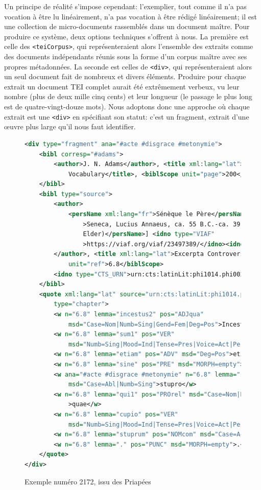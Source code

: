 Un principe de réalité s'impose cependant: l'exemplier, tout comme il n'a pas vocation à être lu linéairement, n'a pas vocation à être rédigé linéairement; il est une collection de micro-documents rassemblés dans un document maître. Pour produire ce système, deux options techniques s'offrent à nous. La première est celle des \texttt{<teiCorpus>}, qui représenteraient alors l'ensemble des extraits comme des documents indépendants réunis sous la forme d'un corpus maître avec ses propres métadonnées. La seconde est celles de \texttt{<div>}, qui représenteraient alors un seul document fait de nombreux et divers éléments. Produire pour chaque extrait un document TEI complet aurait été extrêmement verbeux, vu leur nombre (plus de deux mille cinq cents) et leur longueur (le passage le plus long  est de quatre-vingt-douze mots). Nous adoptons donc une approche où chaque extrait est une \texttt{<div>} en spécifiant son statut: c'est un fragment, extrait d'une œuvre plus large qu'il nous faut identifier.

\begin{figure}
\begin{lstlisting}[language=XML]
<div type="fragment" ana="#acte #disgrace #metonymie">
    <bibl corresp="#adams">
        <author>J. N. Adams</author>, <title xml:lang="lat">The Latin Sexual
            Vocabulary</title>, <biblScope unit="page">200</biblScope>
    </bibl>
    <bibl type="source">
        <author>
            <persName xml:lang="fr">Sénèque le Père</persName> [<persName xml:lang="eng"
                >Seneca, Lucius Annaeus, ca. 55 B.C.-ca. 39 A.D. (Seneca the
                Elder)</persName>] <idno type="VIAF"
                >https://viaf.org/viaf/23497389/</idno><idno type="LC">n82-166595</idno>
        </author>, <title xml:lang="lat">Excerpta Controversiae</title>, <biblScope
            unit="ref">6.8</biblScope>
        <idno type="CTS_URN">urn:cts:latinLit:phi1014.phi002.perseus-lat1</idno>
    </bibl>
    <quote xml:lang="lat" source="urn:cts:latinLit:phi1014.phi002.perseus-lat1:6.8"
        type="chapter">
        <w n="6.8" lemma="incestus2" pos="ADJqua"
            msd="Case=Nom|Numb=Sing|Gend=Fem|Deg=Pos">Incesta</w>
        <w n="6.8" lemma="sum1" pos="VER"
            msd="Numb=Sing|Mood=Ind|Tense=Pres|Voice=Act|Person=3">est</w>
        <w n="6.8" lemma="etiam" pos="ADV" msd="Deg=Pos">etiam</w>
        <w n="6.8" lemma="sine" pos="PRE" msd="MORPH=empty">sine</w>
        <w ana="#acte #disgrace #metonymie" n="6.8" lemma="stuprum" pos="NOMcom"
            msd="Case=Abl|Numb=Sing">stupro</w>
        <w n="6.8" lemma="qui1" pos="PROrel" msd="Case=Nom|Numb=Sing|Gend=Fem"
            >quae</w>
        <w n="6.8" lemma="cupio" pos="VER"
            msd="Numb=Sing|Mood=Ind|Tense=Pres|Voice=Act|Person=3">cupit</w>
        <w n="6.8" lemma="stuprum" pos="NOMcom" msd="Case=Acc|Numb=Sing">stuprum</w>
        <w n="6.8" lemma="." pos="PUNC" msd="MORPH=empty">.</w>
    </quote>
</div>
\end{lstlisting}
    \caption{Exemple numéro 2172, issu des Priapées}
    \label{fig:chap1:part3:exemple_xml}
\end{figure}

